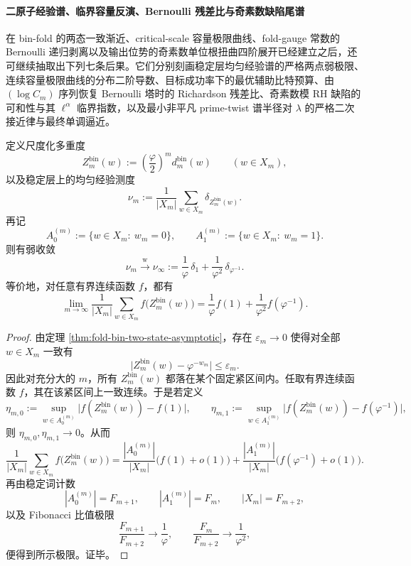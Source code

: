 \paragraph{二原子经验谱、临界容量反演、Bernoulli 残差比与奇素数缺陷尾谱}
在 bin-fold 的两态一致渐近、critical-scale 容量极限曲线、fold-gauge 常数的 Bernoulli 递归剥离以及输出位势的奇素数单位根扭曲四阶展开已经建立之后，还可继续抽取出下列七条后果。它们分别刻画稳定层均匀经验谱的严格两点弱极限、连续容量极限曲线的分布二阶导数、目标成功率下的最优辅助比特预算、由 \((\log C_m)\) 序列恢复 Bernoulli 塔时的 Richardson 残差比、奇素数模 RH 缺陷的可和性与其 \(\ell^\alpha\) 临界指数，以及最小非平凡 prime-twist 谱半径对 \(\lambda\) 的严格二次接近律与最终单调逼近。

\begin{theorem}\label{thm:xi-time-part70-binfold-uniform-empirical-two-point-law}
定义尺度化多重度
\[
Z_m^{\mathrm{bin}}(w):=\left(\frac{\varphi}{2}\right)^m d_m^{\mathrm{bin}}(w)
\qquad (w\in X_m),
\]
以及稳定层上的均匀经验测度
\[
\nu_m:=\frac{1}{|X_m|}\sum_{w\in X_m}\delta_{Z_m^{\mathrm{bin}}(w)}.
\]
再记
\[
A_0^{(m)}:=\{w\in X_m:\ w_m=0\},
\qquad
A_1^{(m)}:=\{w\in X_m:\ w_m=1\}.
\]
则有弱收敛
\[
\nu_m\xrightarrow{\mathrm w}\nu_\infty
:=
\frac{1}{\varphi}\,\delta_1+\frac{1}{\varphi^2}\,\delta_{\varphi^{-1}}.
\]
等价地，对任意有界连续函数 \(f\)，都有
\[
\lim_{m\to\infty}\frac{1}{|X_m|}\sum_{w\in X_m}f\!\bigl(Z_m^{\mathrm{bin}}(w)\bigr)
=
\frac{1}{\varphi}f(1)+\frac{1}{\varphi^2}f(\varphi^{-1}).
\]
\end{theorem}
\begin{proof}
由定理 \ref{thm:fold-bin-two-state-asymptotic}，存在 \(\varepsilon_m\to 0\) 使得对全部 \(w\in X_m\) 一致有
\[
\bigl|Z_m^{\mathrm{bin}}(w)-\varphi^{-w_m}\bigr|\le \varepsilon_m.
\]
因此对充分大的 \(m\)，所有 \(Z_m^{\mathrm{bin}}(w)\) 都落在某个固定紧区间内。任取有界连续函数 \(f\)，其在该紧区间上一致连续。于是若定义
\[
\eta_{m,0}:=\sup_{w\in A_0^{(m)}}\bigl|f(Z_m^{\mathrm{bin}}(w))-f(1)\bigr|,
\qquad
\eta_{m,1}:=\sup_{w\in A_1^{(m)}}\bigl|f(Z_m^{\mathrm{bin}}(w))-f(\varphi^{-1})\bigr|,
\]
则 \(\eta_{m,0},\eta_{m,1}\to 0\)。从而
\[
\frac{1}{|X_m|}\sum_{w\in X_m}f\!\bigl(Z_m^{\mathrm{bin}}(w)\bigr)
=
\frac{|A_0^{(m)}|}{|X_m|}\bigl(f(1)+o(1)\bigr)
+
\frac{|A_1^{(m)}|}{|X_m|}\bigl(f(\varphi^{-1})+o(1)\bigr).
\]
再由稳定词计数
\[
|A_0^{(m)}|=F_{m+1},
\qquad
|A_1^{(m)}|=F_m,
\qquad
|X_m|=F_{m+2},
\]
以及 Fibonacci 比值极限
\[
\frac{F_{m+1}}{F_{m+2}}\to \frac{1}{\varphi},
\qquad
\frac{F_m}{F_{m+2}}\to \frac{1}{\varphi^2},
\]
便得到所示极限。证毕。
\end{proof}

